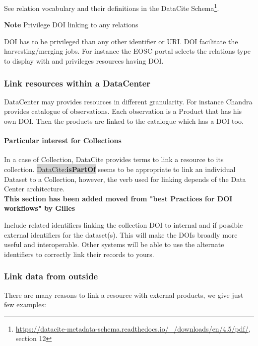 \documentclass[11pt,a4paper]{ivoa}
\newcommand{\dataciteterm}[1]{\colorbox{lightgray}{DataCite:\textbf{#1}}}
\newcommand{\important}[1]{
	\begin{bigdescription}
		\item \color{ivoacolor}\textbf{Note} #1
	\end{bigdescription}
}
\begin{document}
See relation vocabulary and their definitions in the DataCite Schema\footnote{\url{https://datacite-metadata-schema.readthedocs.io/_/downloads/en/4.5/pdf/}, section 12}.


\important{Privilege DOI linking to any relations}

DOI has to be privileged than any other identifier or URI. DOI facilitate the harvesting/merging jobs. For instance the EOSC portal selects the relations type to display with and privileges resources having DOI.

\subsubsection{Link resources within a DataCenter}
DataCenter may provides resources in different granularity. For instance Chandra provides catalogue of observations. Each observation is a Product that has his own DOI.
Then the products are linked to the catalogue which has a DOI too.

\paragraph{Particular interest for Collections}
In a case of Collection, DataCite provides terms to link a resource  to its collection. 
\dataciteterm{isPartOf}  seems to be appropriate to link an individual Dataset to a Collection, however, the verb used for linking depends of the Data Center architecture. \\

\textbf{\color{red}This section has been added moved from "best Practices for DOI workflows"  by Gilles }


Include related identifiers linking the collection DOI to internal and if possible external identifiers for the dataset(s). 
This will make the DOIs broadly more useful and interoperable.
Other systems will be able to use the alternate identifiers to correctly link their records to yours.


\subsubsection{Link data from outside}
There are many reasons to link a resource with external products, we give just few examples:
\end{document}
